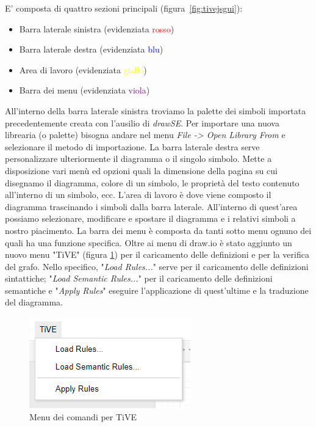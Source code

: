            E' composta di quattro sezioni principali (figura~\ref{fig:tivejsgui}):
            \begin{itemize}
                \item Barra laterale sinistra (evidenziata \textcolor{red}{rosso})
                \item Barra laterale destra (evidenziata \textcolor{blue}{blu})
                \item Area di lavoro (evidenziata \textcolor{yellow}{giallo})
                \item Barra dei menu (evidenziata \textcolor{purple}{viola})
            \end{itemize}
            All'interno della barra laterale sinistra troviamo la palette dei simboli importata precedentemente creata con l'ausilio di \textit{drawSE}. Per importare una nuova librearia (o palette) bisogna andare nel menu \textit{File -> Open Library From} e selezionare il metodo di importazione.
            \newline
            La barra laterale destra serve personalizzare ulteriormente il diagramma o il singolo simbolo. Mette a disposizione vari menù ed opzioni quali la dimensione della pagina su cui disegnamo il diagramma, colore di un simbolo, le proprietà del testo contenuto all'interno di un simbolo, ecc. 
            \newline
            L'area di lavoro è dove viene composto il diagramma trascinando i simboli dalla barra laterale. All'interno di quest'area possiamo selezionare, modificare e spostare il diagramma e i relativi simboli a nostro piacimento.
            \newline
            La barra dei menu è composta da tanti sotto menu ognuno dei quali ha una funzione specifica. Oltre ai menu di draw.io è stato aggiunto un nuovo menu "TiVE" (figura \ref{fig:tivemenu}) per il caricamento delle definizioni e per la verifica del grafo. Nello specifico, "\textit{Load Rules...}" serve per il caricamento delle definizioni sintattiche; "\textit{Load Semantic Rules...}" per il caricamento delle definizioni semantiche e "\textit{Apply Rules}" eseguire l'applicazione di quest'ultime e la traduzione del diagramma.
            
            \begin{figure}[htbp]
                \centering
                \includegraphics[]{Figure/tive_menu.PNG}
                \caption{Menu dei comandi per TiVE}
                \label{fig:tivemenu}
            \end{figure}

